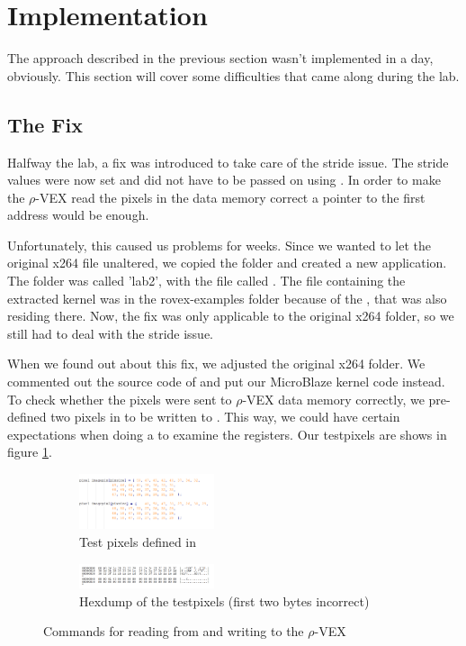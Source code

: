 
\section{Implementation}

The approach described in the previous section wasn't implemented in a day, obviously. This section will cover some difficulties that came along during the lab.

\subsection{The Fix}

Halfway the lab, a fix was introduced to take care of the stride issue. The stride values were now set and did not have to be passed on using . In order to make the $\rho$-VEX read the pixels in the data memory correct a pointer to the first address would be enough.

Unfortunately, this caused us problems for weeks. Since we wanted to let the original x264 file unaltered, we copied the folder and created a new application. The folder was called 'lab2', with the  file called . The  file containing the extracted kernel was in the rovex-examples folder because of the , that was also residing there. Now, the fix was only applicable to the original x264 folder, so we still had to deal with the stride issue.

When we found out about this fix, we adjusted the original x264 folder. We commented out the source code of  and put our MicroBlaze kernel code instead. To check whether the pixels were sent to $\rho$-VEX data memory correctly, we pre-defined two pixels in  to be written to . This way, we could have certain expectations when doing a  to examine the registers. Our testpixels are shows in figure \ref{fig:test}.

\begin{figure}
	\centering
	\begin{subfigure} [h] {0.5\textwidth}
		\centering
		\includegraphics[width=150px]{Pictures/testpixels}
		\caption{Test pixels defined in }
		\label{fig:test}
	\end{subfigure}
	\quad
	\begin{subfigure} [h] {0.5\textwidth}
		\centering
		\includegraphics[width=150px]{Pictures/hextest}
		\caption{Hexdump of the testpixels (first two bytes incorrect)}
		\label{fig:testhex}
	\end{subfigure}
	\quad
\caption{Commands for reading from and writing to the $\rho$-VEX}%
\label{}%
\end{figure}


